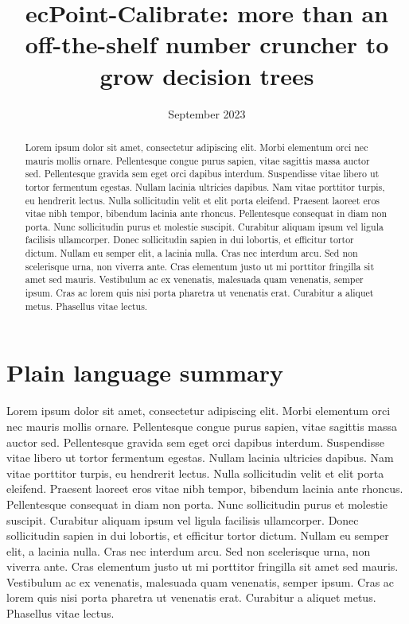 \documentclass[techmemo]{ecmwfrep}%
\title{ecPoint-Calibrate: more than an off-the-shelf number cruncher to grow decision trees}
\date{September 2023}
\begin{document}
\maketitle
\begin{abstract}
Lorem ipsum dolor sit amet, consectetur adipiscing elit. Morbi elementum orci nec mauris mollis ornare. Pellentesque congue purus sapien, vitae sagittis massa auctor sed. Pellentesque gravida sem eget orci dapibus interdum. Suspendisse vitae libero ut tortor fermentum egestas. Nullam lacinia ultricies dapibus. Nam vitae porttitor turpis, eu hendrerit lectus. Nulla sollicitudin velit et elit porta eleifend. Praesent laoreet eros vitae nibh tempor, bibendum lacinia ante rhoncus. Pellentesque consequat in diam non porta. Nunc sollicitudin purus et molestie suscipit. Curabitur aliquam ipsum vel ligula facilisis ullamcorper. Donec sollicitudin sapien in dui lobortis, et efficitur tortor dictum. Nullam eu semper elit, a lacinia nulla. Cras nec interdum arcu. Sed non scelerisque urna, non viverra ante. Cras elementum justo ut mi porttitor fringilla sit amet sed mauris. Vestibulum ac ex venenatis, malesuada quam venenatis, semper ipsum. Cras ac lorem quis nisi porta pharetra ut venenatis erat. Curabitur a aliquet metus. Phasellus vitae lectus.
\end{abstract}

\section*{Plain language summary}
Lorem ipsum dolor sit amet, consectetur adipiscing elit. Morbi elementum orci nec mauris mollis ornare. Pellentesque congue purus sapien, vitae sagittis massa auctor sed. Pellentesque gravida sem eget orci dapibus interdum. Suspendisse vitae libero ut tortor fermentum egestas. Nullam lacinia ultricies dapibus. Nam vitae porttitor turpis, eu hendrerit lectus. Nulla sollicitudin velit et elit porta eleifend. Praesent laoreet eros vitae nibh tempor, bibendum lacinia ante rhoncus. Pellentesque consequat in diam non porta. Nunc sollicitudin purus et molestie suscipit. Curabitur aliquam ipsum vel ligula facilisis ullamcorper. Donec sollicitudin sapien in dui lobortis, et efficitur tortor dictum. Nullam eu semper elit, a lacinia nulla. Cras nec interdum arcu. Sed non scelerisque urna, non viverra ante. Cras elementum justo ut mi porttitor fringilla sit amet sed mauris. Vestibulum ac ex venenatis, malesuada quam venenatis, semper ipsum. Cras ac lorem quis nisi porta pharetra ut venenatis erat. Curabitur a aliquet metus. Phasellus vitae lectus.
\end{document}
